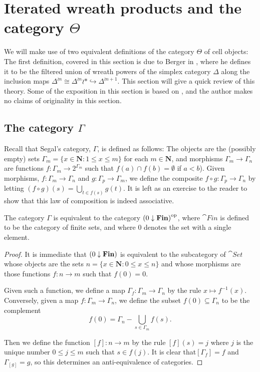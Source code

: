 \section{Iterated wreath products and the category $\Theta$}
\label{sec:wreath}

We will make use of two equivalent definitions of the category \(\Theta\) of cell objects: The first definition, covered in this section is due to Berger in \cite{berger-iterated-wreath}, where he defines it to be the filtered union of wreath powers of the simplex category \(\Delta\) along the inclusion maps \(\Delta^{\wr n}\cong \Delta^{\wr n}\wr \ast \hookrightarrow \Delta^{\wr n+1}\).  This section will give a quick review of this theory.  Some of the exposition in this section is based on \cite{cisinski-decalage}, and the author makes no claims of originality in this section. 

\subsection{The category $\Gamma$}

Recall that Segal's category, \(\Gamma\), is defined as follows: The objects are the (possibly empty) sets \(\Gamma_m=\{x\in \mathbf{N}\colon 1\leq x\leq m\}\) for each \(m\in \mathbf{N}\), and morphisms \(\Gamma_m\to \Gamma_n\) are functions \(f\colon \Gamma_m\to 2^{\Gamma_m}\) such that \(f(a)\cap f(b) = \emptyset\) if \(a<b\)).  Given morphisms, \(f\colon \Gamma_m\to \Gamma_n\) and \(g\colon \Gamma_p\to \Gamma_m\), we define the composite \(f\circ g  \colon \Gamma_p\to \Gamma_n\) by letting \((f\circ g)(s)=\bigcup_{t\in f(s)}g(t)\).  It is left as an exercise to the reader to show that this law of composition is indeed associative.  

\begin{prop}The category \(\Gamma\) is equivalent to the category \({(0\downarrow {\operatorname{\mathbf{Fin}}})}^{\operatorname{op}}\), where \(\cat{Fin}\) is defined to be the category of finite sets, and where \(0\) denotes the set with a single element.
\end{prop}
\begin{proof}
It is immediate that \({(0\downarrow {\operatorname{\mathbf{Fin}}})}\) is equivalent to the subcategory of \(\cat{Set}\) whose objects are the sets \(n=\{x\in \mathbf{N}\colon 0\leq x\leq n\}\) and whose morphisms are those functions \(f\colon n\to m\) such that \(f(0)=0\).  

Given such a function, we define a map \(\Gamma_f:\Gamma_m\to \Gamma_n\) by the rule \(x\mapsto f^{-1}(x)\).  Conversely, given a map \(f\colon \Gamma_m\to \Gamma_n\), we define the subset \(f(0)\subseteq \Gamma_n\) to be the complement \[f(0)=\Gamma_n - \bigcup_{s\in \Gamma_m} f(s).\]  

Then we define the function \([f]:n\to m\) by the rule \([f](s)=j\) where \(j\) is the unique number \(0\leq j\leq m\) such that \(s\in f(j)\).  It is clear that\([\Gamma_f]=f\) and \(\Gamma_{[g]}=g\), so this determines an anti-equivalence of categories.
\end{proof}

